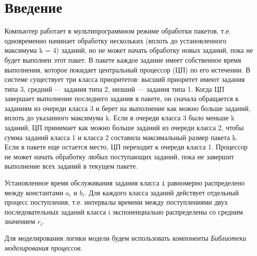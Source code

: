 \graphicspath{{./sixth/img/}} %

\section*{\LARGE Введение}
Компьютер работает в мультипрограммном режиме
обработки пакетов, т.е. одновременно начинает обработку
нескольких (вплоть до установленного максимума k = 4)
заданий, но не может начать обработку новых заданий,
пока не будет выполнен этот пакет. В пакете каждое
задание имеет собственное время выполнения, которое
покидает центральный процессор (ЦП) по его истечении. В
системе существует три класса приоритетов: высший
приоритет имеют задания типа 3, средний --- задания типа
2, низший --- задания типа 1. Когда ЦП завершает
выполнение последнего задания в пакете, он сначала
обращается к заданиям из очереди класса 3 и берет на
выполнение как можно больше заданий, вплоть до
указанного максимума k. Если в очереди класса 3 было
меньше k заданий, ЦП принимает как можно больше
заданий из очереди класса 2, чтобы сумма заданий класса
1 и класса 2 составила максимальный размер пакета k. Если
в пакете еще остается место, ЦП переходит к очереди класса
1. Процессор не может начать обработку любых
поступающих заданий, пока не завершит выполнение всех
заданий в текущем пакете.\par
Установленное время обслуживания задания класса \texttt{i}
равномерно распределено между константами \(a_i\) и \(b_i\). Для
каждого класса заданий действует отдельный процесс
поступления, т.е. интервалы времени между поступлениями
двух последовательных заданий класса i экспоненциально
распределены со средним значением \(r_i\).\par
Для моделирования логики модели будем использовать
компоненты \textit{Библиотеки моделирования процессов}.

\clearpage

